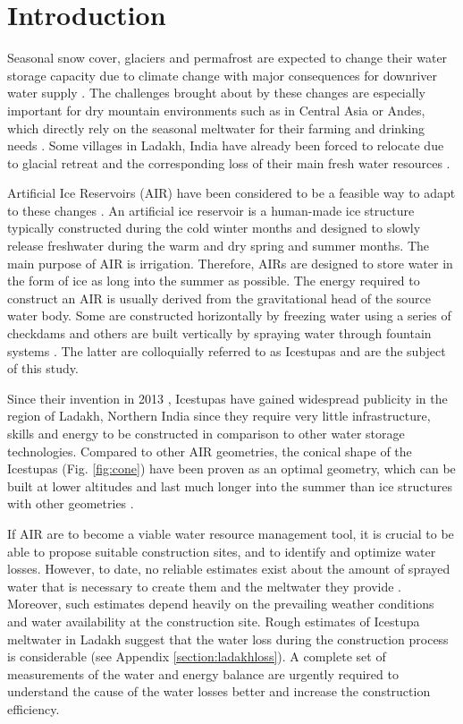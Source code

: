 \documentclass[utf8]{frontiersSCNS} %
\begin{document}
\section{Introduction}

Seasonal snow cover, glaciers and permafrost are expected to change their water
storage capacity due to climate change with major consequences for downriver
water supply \citep{Immerzeel_2020}. The challenges brought about by these
changes are especially important for dry mountain environments such as in
Central Asia or Andes, which directly rely on the seasonal meltwater for their
farming and drinking needs \citep{HoelzleBarandun_2019, Apel_2018,
Buytaert_2017, Chen_2016, UNGERSHAYESTEH_2013}. Some villages in Ladakh, India
have already been forced to relocate due to glacial retreat and the
corresponding loss of their main fresh water resources \citep{zanskar}. 

Artificial Ice Reservoirs (AIR) have been considered to be a feasible way to
adapt to these changes \citep{IPCC_2019, 10.1659/MRD-JOURNAL-D-18-00072.1}. An
artificial ice reservoir is a human-made ice structure typically constructed
during the cold winter months and designed to slowly release freshwater during
the warm and dry spring and summer months. The main purpose of AIR is
irrigation. Therefore, AIRs are designed to store water in the form of ice as
long into the summer as possible. The energy required to construct an AIR is
usually derived from the gravitational head of the source water body. Some are
constructed horizontally by freezing water using a series of checkdams and
others are built vertically by spraying water through fountain systems
\citep{Nusser_2018}. The latter are colloquially referred to as Icestupas and
are the subject of this study.

Since their invention in 2013 \citep{campaign}, Icestupas have gained widespread publicity in the region of Ladakh, Northern India since they require very little infrastructure, skills and energy to be constructed in comparison to other water storage technologies. Compared to other AIR geometries, the conical shape of the Icestupas (Fig. \ref{fig:cone}) have been proven as an optimal geometry, which can be built at lower altitudes and last much longer into the summer than ice structures with other geometries \citep{campaign}.

If AIR are to become a viable water resource management tool, it is crucial to be able to propose suitable construction sites, and to identify and optimize water losses. However, to date, no reliable estimates exist about the amount of sprayed water that is necessary to create them and the meltwater they provide \citep{Nusser_2018}. Moreover, such estimates depend heavily on the prevailing weather conditions and water availability at the construction site. Rough estimates of Icestupa meltwater in Ladakh suggest that the water loss during the construction process is considerable (see Appendix \ref{section:ladakhloss}). A complete set of measurements of the water and energy balance are urgently required to understand the cause of the water losses better and increase the construction efficiency.
\end{document}
